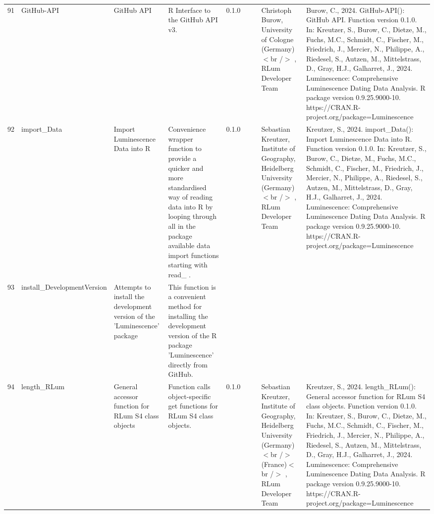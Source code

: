 \begin{table}[ht]
\begin{tabular}{rllllllll}
 \\ 
  91 & GitHub-API & GitHub API & R Interface to the GitHub API v3. & 0.1.0
 &  &  & Christoph Burow, University of Cologne (Germany)$<$br /$>$ , RLum Developer Team & Burow, C., 2024. GitHub-API(): GitHub API. Function version 0.1.0. In: Kreutzer, S., Burow, C., Dietze, M., Fuchs, M.C., Schmidt, C., Fischer, M., Friedrich, J., Mercier, N., Philippe, A., Riedesel, S., Autzen, M., Mittelstrass, D., Gray, H.J., Galharret, J., 2024. Luminescence: Comprehensive Luminescence Dating Data Analysis. R package version 0.9.25.9000-10. https://CRAN.R-project.org/package=Luminescence
 \\ 
  92 & import\_Data & Import Luminescence Data into R & Convenience wrapper function to provide a quicker and more standardised way of reading data into R by looping through all in the package available data import functions starting with  read\_ . & 0.1.0
 &  &  & Sebastian Kreutzer, Institute of Geography, Heidelberg University (Germany)$<$br /$>$ , RLum Developer Team & Kreutzer, S., 2024. import\_Data(): Import Luminescence Data into R. Function version 0.1.0. In: Kreutzer, S., Burow, C., Dietze, M., Fuchs, M.C., Schmidt, C., Fischer, M., Friedrich, J., Mercier, N., Philippe, A., Riedesel, S., Autzen, M., Mittelstrass, D., Gray, H.J., Galharret, J., 2024. Luminescence: Comprehensive Luminescence Dating Data Analysis. R package version 0.9.25.9000-10. https://CRAN.R-project.org/package=Luminescence
 \\ 
  93 & install\_DevelopmentVersion & Attempts to install the development version of the 'Luminescence' package & This function is a convenient method for installing the development version of the R package 'Luminescence' directly from GitHub. &  &  &  &  &  \\ 
  94 & length\_RLum & General accessor function for RLum S4 class objects & Function calls object-specific get functions for RLum S4 class objects. & 0.1.0
 &  &  & Sebastian Kreutzer, Institute of Geography, Heidelberg University (Germany)$<$br /$>$ (France)$<$br /$>$ , RLum Developer Team & Kreutzer, S., 2024. length\_RLum(): General accessor function for RLum S4 class objects. Function version 0.1.0. In: Kreutzer, S., Burow, C., Dietze, M., Fuchs, M.C., Schmidt, C., Fischer, M., Friedrich, J., Mercier, N., Philippe, A., Riedesel, S., Autzen, M., Mittelstrass, D., Gray, H.J., Galharret, J., 2024. Luminescence: Comprehensive Luminescence Dating Data Analysis. R package version 0.9.25.9000-10. https://CRAN.R-project.org/package=Luminescence
 \\ 

\end{tabular}
\end{table}
